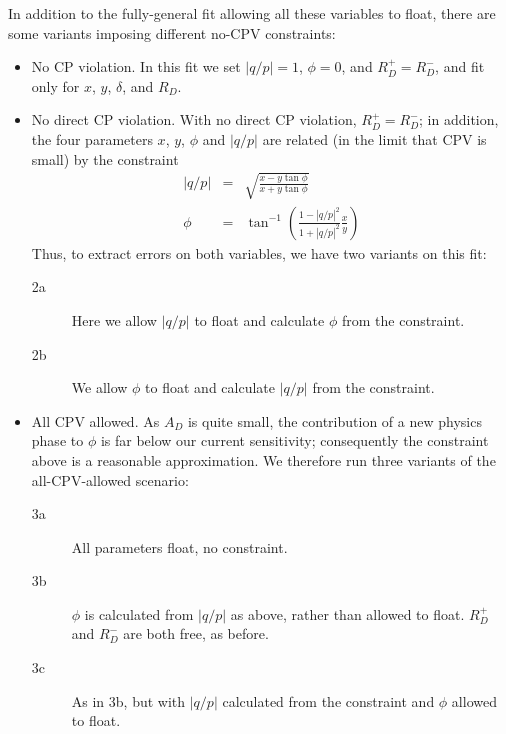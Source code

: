 In addition to the fully-general fit allowing all these variables to float, 
there are some variants imposing different no-CPV constraints:
\begin{itemize}
\item No CP violation. In this fit we set $|q/p|=1$, $\phi=0$, and $R_D^+=R_D^-$, 
and fit only for $x$, $y$, $\delta$, and $R_D$. 
\item No direct CP violation. With no direct CP violation, $R_D^+=R_D^-$;
in addition, the four parameters $x$, $y$, $\phi$ and $|q/p|$ are related 
(in the limit that CPV is small) by the constraint
\begin{eqnarray}
|q/p| &=& \sqrt{\frac{x - y\tan\phi}{x + y\tan\phi}}\\
\phi &=& \tan^{-1}\left(\frac{1-|q/p|^2}{1+|q/p|^2}\frac{x}{y}\right)
\end{eqnarray}
Thus, to extract errors on both variables, we have two variants on this fit:
\begin{description}
\item[2a] Here we allow $|q/p|$ to float and calculate $\phi$
from the constraint. 
\item[2b] We allow $\phi$ to float and calculate $|q/p|$ from the constraint. 
\end{description}
\item All CPV allowed. As $A_D$ is quite
small, the contribution of a new physics phase to $\phi$ is far below
our current sensitivity; consequently the constraint above is a reasonable
approximation. We therefore run three variants of the all-CPV-allowed 
scenario:
\begin{description}
\item[3a] All parameters float, no constraint.
\item[3b] $\phi$ is calculated from $|q/p|$ as above, rather than allowed to float.
$R_D^+$ and $R_D^-$ are both free, as before.
\item[3c] As in 3b, but with $|q/p|$ calculated from the constraint and $\phi$ allowed
to float.
\end{description}
\end{itemize}


